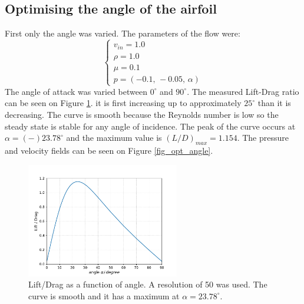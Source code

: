 \documentclass[12pt, a4paper]{article}
\begin{document}
    \subsection{Optimising the angle of the airfoil}
        First only the angle was varied. The parameters of the flow were:
        \begin{equation}
        \begin{cases}
            v_{in} = 1.0 \\
            \rho = 1.0 \\
            \mu = 0.1 \\
            p = (-0.1,\, -0.05,\, \alpha)
        \end{cases}
        \end{equation}
        The angle of attack was varied between $0^\circ$ and $90^\circ$. The measured Lift-Drag ratio can be seen on Figure \ref{fig_lift_drag}. it is first increasing up to approximately $25^\circ$ than it is decreasing. The curve is smooth because the Reynolds number is low so the steady state is stable for any angle of incidence. The peak of the curve occurs at $\alpha = (-) 23.78^\circ$ and the maximum value is $(L/D)_{max} = 1.154$. The pressure and velocity fields can be seen on Figure \ref{fig_opt_angle}.
        \begin{figure}[htbp]
            \centering
            \includegraphics[height=5cm]{lift_drag.pdf}
            \caption{Lift/Drag as a function of angle. A resolution of 50 was used. The curve is smooth and it has a maximum at $\alpha = 23.78^\circ$.}
            \label{fig_lift_drag}
        \end{figure}
\end{document}
